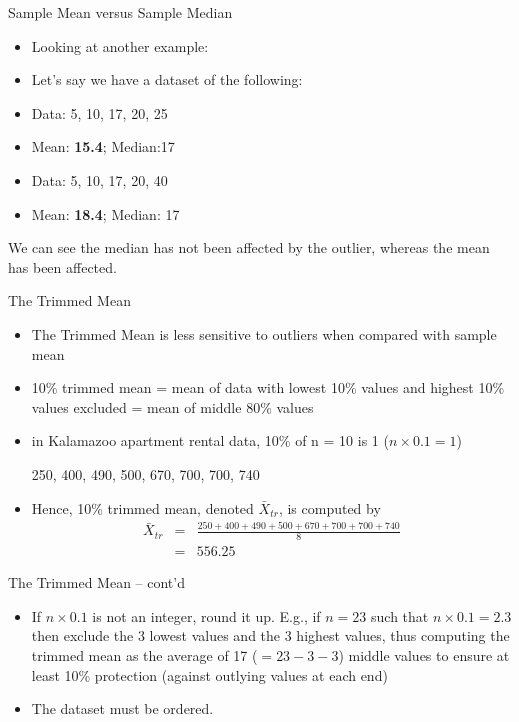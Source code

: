 \documentclass[14pt]{beamer}\usepackage[]{graphicx}\usepackage[]{color}
\begin{document}
\begin{frame}[fragile]{Sample Mean versus Sample Median}

\begin{itemize}
\item Looking at another example:
\item Let's say we have a dataset of the following:  
\item Data: 5, 10, 17, 20, 25
\item Mean: \textbf{15.4}; Median:17
\item Data: 5, 10, 17, 20, 40
\item Mean: \textbf{18.4};  Median: 17
\end{itemize}

We can see the median has not been affected by the outlier, whereas the  mean has been affected.

\end{frame}

\begin{frame}[fragile]{The Trimmed Mean}


{\small{
\begin{itemize}
\item<1-> The Trimmed Mean is less sensitive to outliers when compared with sample mean  
\item<2-> 10\% trimmed mean = mean of data with lowest 10\% values and  highest 10\% values excluded = mean of middle 80\% values
\item<3-> in Kalamazoo apartment rental data, 10\% of n = 10 is 1 ($n \times 0.1 = 1$)

250, 400, 490, 500, 670, 700, 700, 740
\item<4-> Hence, 10\% trimmed mean, denoted $\bar{X}_{tr}$, is computed by
\begin{eqnarray*}
\bar{X}_{tr} &=& \frac{250+400+490+500+670+700+700+740}{8} \\
     &=&556.25
\end{eqnarray*}
\end{itemize}
}}
\end{frame}

\begin{frame}[fragile]{The Trimmed Mean -- cont'd}

\begin{itemize}
\item<1-> If $n \times 0.1$ is not an integer, round it up. E.g., if $n = 23$ such that  $n \times 0.1 = 2.3$ then exclude the 3 lowest values and the 3 highest values, thus computing the trimmed mean as the  average of 17 ($= 23 - 3 - 3$) middle values to ensure at least  10\% protection (against outlying values at each end)

\item<2-> The dataset must be ordered.
\end{itemize}

\end{frame}
\end{document}
